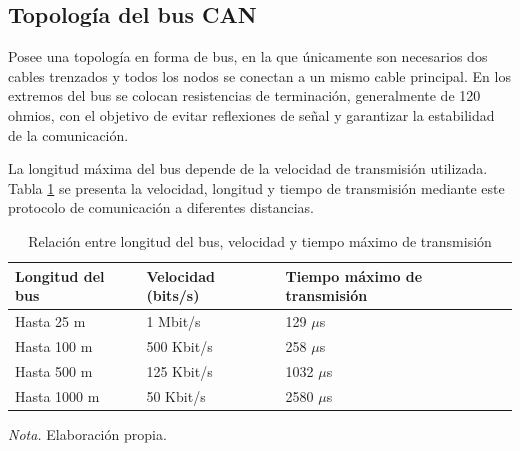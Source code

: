 \subsection{Topología del bus CAN}
Posee una topología en forma de bus, en la que únicamente son necesarios dos cables trenzados y todos los nodos se conectan a un mismo cable principal. En los extremos del bus se colocan resistencias de terminación, generalmente de 120 ohmios, con el objetivo de evitar reflexiones de señal y garantizar la estabilidad de la comunicación. \citep{Lifeder_BusTopology,IndustrialMonitorDirect_CANTermination}

La longitud máxima del bus depende de la velocidad de transmisión utilizada. Tabla \ref{bus_length} se presenta la velocidad, longitud y tiempo de transmisión  mediante este protocolo de comunicación a diferentes distancias. 

\begin{table}[h]
	\centering
	\captionsetup{labelformat=simple, labelsep=newline, textfont=it, labelfont=bf}
	\caption{Relación entre longitud del bus, velocidad y tiempo máximo de transmisión}
	\label{bus_length}
	\vspace{0.3cm}
	
	\begin{tabularx}{\linewidth}{X X X}
		\toprule %
		\rowcolor[rgb]{0.851, 0.851, 0.851}
		\textbf{Longitud del bus} & \textbf{Velocidad (bits/s)} & \textbf{Tiempo máximo de transmisión} \\
		\midrule %
		Hasta 25 m & 1 Mbit/s & 129 $\mu$s \\
		\addlinespace
		Hasta 100 m & 500 Kbit/s & 258 $\mu$s \\
		\addlinespace
		Hasta 500 m & 125 Kbit/s & 1032 $\mu$s \\
		\addlinespace
		Hasta 1000 m & 50 Kbit/s & 2580 $\mu$s \\
		\bottomrule %
	\end{tabularx}
	\vspace{0.2cm}
	
	\begin{flushleft}
		\footnotesize \textit{Nota.} Elaboración propia.
	\end{flushleft}
\end{table}



